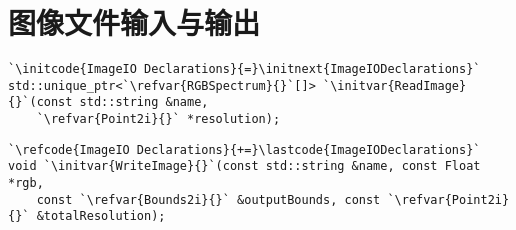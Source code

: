 \section{图像文件输入与输出}\label{sec:图像文件输入与输出}
\begin{lstlisting}
`\initcode{ImageIO Declarations}{=}\initnext{ImageIODeclarations}`
std::unique_ptr<`\refvar{RGBSpectrum}{}`[]> `\initvar{ReadImage}{}`(const std::string &name,
    `\refvar{Point2i}{}` *resolution);
\end{lstlisting}
\begin{lstlisting}
`\refcode{ImageIO Declarations}{+=}\lastcode{ImageIODeclarations}`
void `\initvar{WriteImage}{}`(const std::string &name, const Float *rgb,
    const `\refvar{Bounds2i}{}` &outputBounds, const `\refvar{Point2i}{}` &totalResolution);
\end{lstlisting}